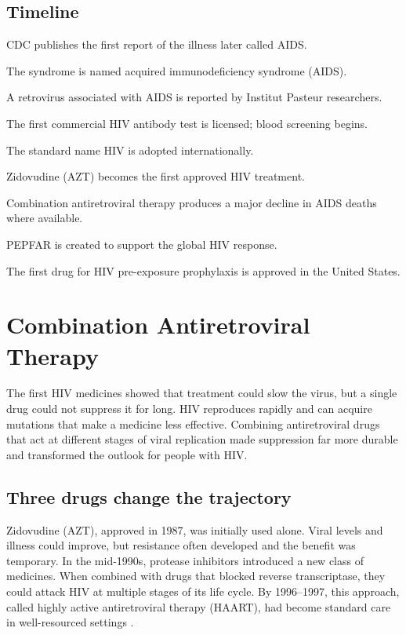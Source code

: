 \documentclass[12pt,oneside]{book}
\begin{document}
\section*{Timeline}
\begin{description}[leftmargin=2.3cm,style=nextline]
  \item[1981] CDC publishes the first report of the illness later called AIDS.
  \item[1982] The syndrome is named acquired immunodeficiency syndrome (AIDS).
  \item[1983] A retrovirus associated with AIDS is reported by Institut Pasteur researchers.
  \item[1985] The first commercial HIV antibody test is licensed; blood screening begins.
  \item[1986] The standard name HIV is adopted internationally.
  \item[1987] Zidovudine (AZT) becomes the first approved HIV treatment.
  \item[1996--1997] Combination antiretroviral therapy produces a major decline in AIDS deaths where available.
  \item[2003] PEPFAR is created to support the global HIV response.
  \item[2012] The first drug for HIV pre-exposure prophylaxis is approved in the United States.
\end{description}
\chapter[Combination Antiretroviral Therapy]{Combination Antiretroviral Therapy}

The first HIV medicines showed that treatment could slow the virus, but a
single drug could not suppress it for long. HIV reproduces rapidly and
can acquire mutations that make a medicine less effective. Combining
antiretroviral drugs that act at different stages of viral replication
made suppression far more durable and transformed the outlook for people
with HIV.

\section{Three drugs change the trajectory}
Zidovudine (AZT), approved in 1987, was initially used alone. Viral levels
and illness could improve, but resistance often developed and the benefit
was temporary. In the mid-1990s, protease inhibitors introduced a new
class of medicines. When combined with drugs that blocked reverse
transcriptase, they could attack HIV at multiple stages of its life cycle.
By 1996--1997, this approach, called highly active antiretroviral therapy
(HAART), had become standard care in well-resourced settings
\cite{niaidARTHistory,nih2026}.
\end{document}
